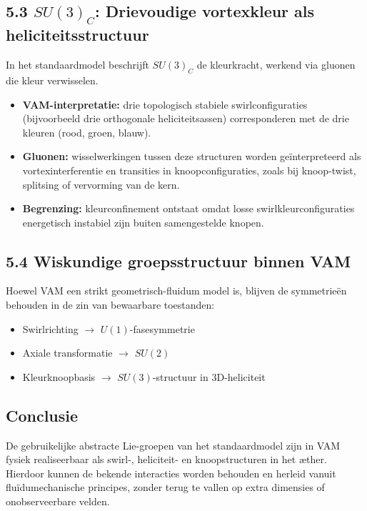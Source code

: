 \subsection*{5.3 $SU(3)_C$: Drievoudige vortexkleur als heliciteitsstructuur}
In het standaardmodel beschrijft $SU(3)_C$ de kleurkracht, werkend via gluonen die kleur verwisselen.
\begin{itemize}
    \item \textbf{VAM-interpretatie:} drie topologisch stabiele swirlconfiguraties (bijvoorbeeld drie orthogonale heliciteitsassen) corresponderen met de drie kleuren (rood, groen, blauw).
    \item \textbf{Gluonen:} wisselwerkingen tussen deze structuren worden geïnterpreteerd als vortexinterferentie en transities in knoopconfiguraties, zoals bij knoop-twist, splitsing of vervorming van de kern.
    \item \textbf{Begrenzing:} kleurconfinement ontstaat omdat losse swirlkleurconfiguraties energetisch instabiel zijn buiten samengestelde knopen.
\end{itemize}

\subsection*{5.4 Wiskundige groepsstructuur binnen VAM}
Hoewel VAM een strikt geometrisch-fluidum model is, blijven de symmetrieën behouden in de zin van bewaarbare toestanden:
\begin{itemize}
    \item Swirlrichting $\rightarrow$ $U(1)$-fasesymmetrie
    \item Axiale transformatie $\rightarrow$ $SU(2)$
    \item Kleurknoopbasis $\rightarrow$ $SU(3)$-structuur in 3D-heliciteit
\end{itemize}

\subsection*{Conclusie}
De gebruikelijke abstracte Lie-groepen van het standaardmodel zijn in VAM fysiek realiseerbaar als swirl-, heliciteit- en knoopstructuren in het æther. Hierdoor kunnen de bekende interacties worden behouden en herleid vanuit fluïdumechanische principes, zonder terug te vallen op extra dimensies of onobserveerbare velden.